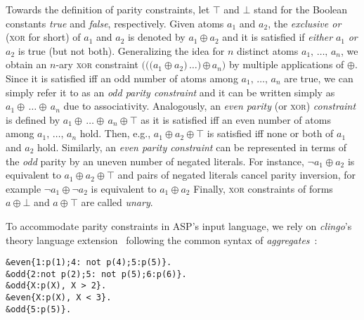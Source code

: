 \documentclass{article}
\newcommand{\XOR}{\textsc{xor}} %
\newcommand{\sysfont}{\textit}
\newcommand{\clingo}{\sysfont{clingo}}
\newcommand{\rg}[3]{{#1}{#2}\,\ldots{#2}\,{#3}}
\newcommand{\xor}{\oplus}
\newcommand{\true}{\top}
\newcommand{\false}{\bot}
\begin{document}
Towards the definition of parity constraints, let $\true$ and $\false$
stand for the Boolean constants \emph{true} and \emph{false},
respectively. %
%
Given atoms $a_1$ and $a_2$, the \emph{exclusive or}
(\XOR{} for short) of $a_1$ and $a_2$ is denoted by $a_1\xor a_2$ and
it is satisfied if \emph{either} $a_1$ \emph{or} $a_2$ is true (but
not both).
Generalizing the idea for $n$ distinct atoms
$\rg{a_1}{,}{a_n}$, we obtain an $n$-ary \XOR{} constraint
$\rg{(((a_1\xor a_2}{)}{\xor\,a_n)}$ by multiple applications of
$\xor$. Since it is satisfied iff an odd number of atoms among
$\rg{a_1}{,}{a_n}$ are true,
we can simply refer it to as an \emph{odd parity constraint}
and it can be written simply as
$\rg{a_1}{\xor}{a_n}$ due to associativity.
%
Analogously, an \emph{even parity} (or \XOR{}) \emph{constraint} is defined by
$\rg{a_1}{\xor}{a_n}\xor\true$ as it is satisfied iff an even number
of atoms among $\rg{a_1}{,}{a_n}$ hold. Then, e.g.,
%
$a_1\xor a_2\xor\true$
%
is satisfied iff none or both of $a_1$ and $a_2$ hold.
%
Similarly, an \emph{even parity constraint} can be represented in terms of the \emph{odd} parity by an uneven
number of negated literals.
For instance, $\neg a_1\xor a_2$ is equivalent to $a_1\xor a_2\xor\true$ and pairs of negated literals cancel parity inversion, for example $\neg a_1\xor \neg a_2$ is equivalent to $a_1\xor a_2$
Finally, \XOR{} constraints of forms $a\xor\false$ and $a\xor\true$
are called \emph{unary}.

To accommodate parity constraints in ASP's input language,
we rely on \clingo’s theory language extension~\cite{DBLP:conf/iclp/GebserKKOSW16}
following the common syntax of \emph{aggregates}~\cite{DBLP:journals/tplp/GebserHKLS15}:

\begin{verbatim}
&even{1:p(1);4: not p(4);5:p(5)}.
&odd{2:not p(2);5: not p(5);6:p(6)}.
&odd{X:p(X), X > 2}.
&even{X:p(X), X < 3}.
&odd{5:p(5)}.
\end{verbatim}
\end{document}
